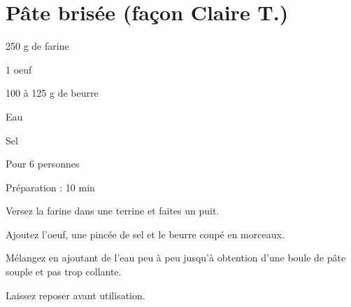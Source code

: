 \section[\normalsize{P\^ate bris\'ee (fa\c con Claire T.)}]{P\^ate bris\'ee (fa\c con Claire T.)}

\begin{ingredients}
\item 250 g de farine
\item 1 oeuf
\item 100 \`a 125 g de beurre
\item Eau
\item Sel
\end{ingredients}
\begin{infos}
\item Pour 6 personnes
\item Préparation : 10 min
\end{infos}
\begin{etapes}
\item Versez la farine dans une terrine et faites un puit. 
\item Ajoutez l'oeuf, une pinc\'ee de sel et le beurre coup\'e en morceaux. 
\item M\'elangez en ajoutant de l'eau peu \`a peu jusqu'\`a obtention d'une boule de p\^ate souple et pas trop collante.
\item Laissez reposer avant utilisation.
\end{etapes}
\begin{conseils}
\end{conseils}
